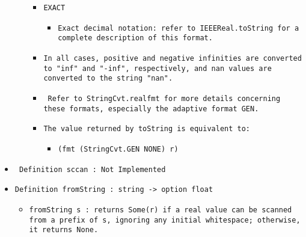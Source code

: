 \documentclass[11pt]{report}
\begin{document}
\begin{itemize}
\begin{itemize}
\begin{itemize}
\begin{itemize}
\end{itemize}

\item  \texttt{EXACT}

\begin{itemize}
\item  \begin{flushleft} \texttt{Exact decimal notation: refer to IEEEReal.toString for a complete description of this format. }\end{flushleft}

\end{itemize}

\item  \begin{flushleft}\texttt{In all cases, positive and negative infinities are converted to "inf" and "-inf", respectively, and nan values are converted to the string "nan". }\end{flushleft}

\item \begin{flushleft}\texttt{ Refer to StringCvt.realfmt for more details concerning these formats, especially the adaptive format GEN. }\end{flushleft}

\item  \texttt{The value returned by toString is equivalent to:}

\begin{itemize}
\item  \texttt{(fmt (StringCvt.GEN NONE) r)}



\end{itemize}

\end{itemize}

\end{itemize}

\item \texttt{ Definition sccan : Not Implemented}

\item  \texttt{Definition fromString : string -> option float}

\begin{itemize}
\item  \begin{flushleft}\texttt{fromString s :  returns Some(r) if a real value can be scanned from a prefix of s, ignoring any initial whitespace; otherwise, it returns None.}\end{flushleft}


\end{itemize}
\end{itemize}
\end{document}
